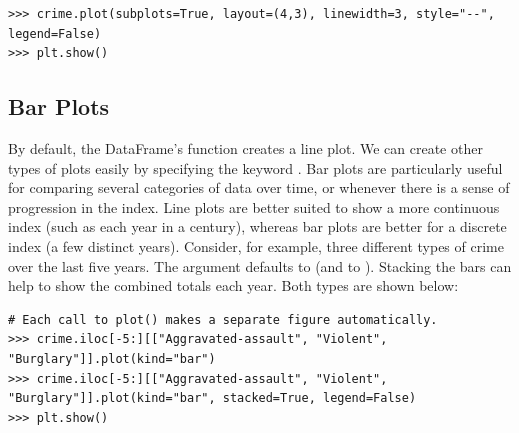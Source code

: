 \begin{lstlisting}
>>> crime.plot(subplots=True, layout=(4,3), linewidth=3, style="--", legend=False)
>>> plt.show()
\end{lstlisting}

\subsection*{Bar Plots}

By default, the DataFrame's  function creates a line plot.
We can create other types of plots easily by specifying the keyword .
Bar plots are particularly useful for comparing several categories of data over time, or whenever there is a sense of progression in the index.
Line plots are better suited to show a more continuous index (such as each year in a century), whereas bar plots are better for a discrete index (a few distinct years).
Consider, for example, three different types of crime over the last five years. The argument  defaults to  (and  to ).  Stacking the bars can help to show the combined totals each year.  Both types are shown below:

\begin{lstlisting}
# Each call to plot() makes a separate figure automatically.
>>> crime.iloc[-5:][["Aggravated-assault", "Violent", "Burglary"]].plot(kind="bar")
>>> crime.iloc[-5:][["Aggravated-assault", "Violent", "Burglary"]].plot(kind="bar", stacked=True, legend=False)
>>> plt.show()
\end{lstlisting}

